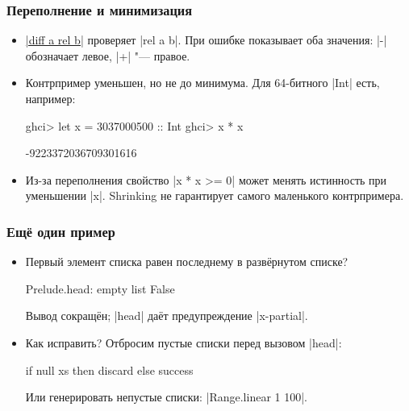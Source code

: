 \documentclass[11pt]{beamer}
\begin{document}
\begin{frame}[fragile]
  \frametitle{Переполнение и минимизация}
  \begin{itemize}
    \item \href{https://hackage.haskell.org/package/hedgehog/docs/Hedgehog.html#v:diff}{\haskinline|diff a rel b|} проверяет \haskinline|rel a b|. При ошибке показывает оба значения: \haskinline|-| обозначает левое, \haskinline|+| "--- правое.
    \item Контрпример уменьшен, но не до минимума. Для 64-битного \haskinline|Int| есть, например:
          \begin{haskellsmall}
            ghci> let x = 3037000500 :: Int
            ghci> x * x
          \end{haskellsmall}
          \pause
          \begin{ghcismall}
            -9223372036709301616
          \end{ghcismall}
    \item Из-за переполнения свойство \haskinline|x * x >= 0| может менять истинность при уменьшении \haskinline|x|. Shrinking не гарантирует самого маленького контрпримера.
  \end{itemize}
\end{frame}

\begin{frame}[fragile]
  \frametitle{Ещё один пример}
  \begin{itemize}
    \item Первый элемент списка равен последнему в развёрнутом списке?
          \pause
          \begin{ghcismall}
            Prelude.head: empty list
            False
          \end{ghcismall}
          {\footnotesize Вывод сокращён; \haskinline|head| даёт предупреждение \ghcinline|x-partial|.}
    \item Как исправить? \pause Отбросим пустые списки перед вызовом \haskinline|head|:
          \begin{haskellsmall}
            if null xs then discard else success
          \end{haskellsmall}
          Или генерировать непустые списки: \haskinline|Range.linear 1 100|.
  \end{itemize}
\end{frame}
\end{document}
